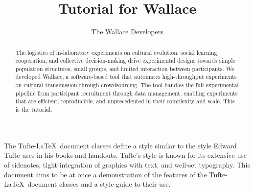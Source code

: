 \documentclass{tufte-handout}
\title{Tutorial for Wallace}
\author[The Wallace Developers]{The Wallace Developers}
\begin{document}
\maketitle%

\begin{abstract}
\noindent
The logistics of in-laboratory experiments on cultural evolution, social
learning, cooperation, and collective decision-making drive experimental
designs towards simple population structures, small groups, and limited
interaction between participants. We developed Wallace, a software-based
tool that automates high-throughput experiments on cultural transmission
through crowdsourcing. The tool handles the full experimental pipeline from
participant recruitment through data management, enabling experiments that
are efficient, reproducible, and unprecedented in their complexity and scale.
This is the tutorial.
\end{abstract}


\noindent The Tufte-\LaTeX\ document classes define a style similar to the
style Edward Tufte uses in his books and handouts.  Tufte's style is known
for its extensive use of sidenotes, tight integration of graphics with
text, and well-set typography.  This document aims to be at once a
demonstration of the features of the Tufte-\LaTeX\ document classes
and a style guide to their use.


\end{document}
